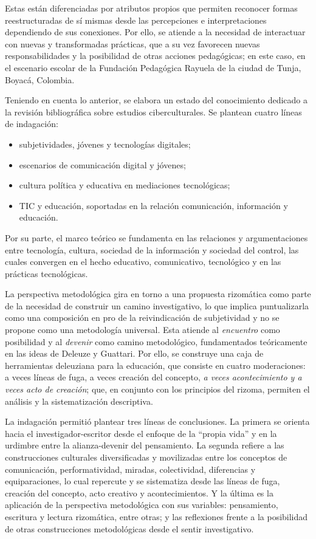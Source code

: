 \documentclass[spanish]{textolivre}
\begin{document}
Estas están diferenciadas por atributos propios que permiten reconocer formas reestructuradas de sí mismas desde las percepciones e interpretaciones dependiendo de sus conexiones. Por ello, se atiende a la necesidad de interactuar con nuevas y transformadas prácticas, que a su vez favorecen nuevas responsabilidades y la posibilidad de otras acciones pedagógicas; en este caso, en el escenario escolar de la Fundación Pedagógica Rayuela de la ciudad de Tunja, Boyacá, Colombia.

Teniendo en cuenta lo anterior, se elabora un estado del conocimiento dedicado a la revisión bibliográfica sobre estudios ciberculturales. Se plantean cuatro líneas de indagación: 

\begin{itemize}
    \item subjetividades, jóvenes y tecnologías digitales;
    \item escenarios de comunicación digital y jóvenes;
    \item cultura política y educativa en mediaciones tecnológicas;
    \item TIC y educación, soportadas en la relación comunicación, información y educación. 
\end{itemize}
    
Por su parte, el marco teórico se fundamenta en las relaciones y argumentaciones entre tecnología, cultura, sociedad de la información y sociedad del control, las cuales convergen en el hecho educativo, comunicativo, tecnológico y en las prácticas tecnológicas. 

La perspectiva metodológica gira en torno a una propuesta rizomática como parte de la necesidad de construir un camino investigativo, lo que implica puntualizarla como una composición en pro de la reivindicación de subjetividad y no se propone como una metodología universal. Esta atiende al \textit{encuentro} como posibilidad y al \textit{devenir} como camino metodológico, fundamentados teóricamente en las ideas de Deleuze y Guattari. Por ello, se construye una caja de herramientas deleuziana para la educación, que consiste en cuatro moderaciones: a veces líneas de fuga, a veces creación del concepto, \textit{a veces acontecimiento y a veces acto de creación}; que, en conjunto con los principios del rizoma, permiten el análisis y la sistematización descriptiva.

La indagación permitió plantear tres líneas de conclusiones. La primera se orienta hacia el investigador-escritor desde el enfoque de la “propia vida” y en la urdimbre entre la alianza-devenir del pensamiento. La segunda refiere a las construcciones culturales diversificadas y movilizadas entre los conceptos de comunicación, performatividad, miradas, colectividad, diferencias y equiparaciones, lo cual repercute y se sistematiza desde las líneas de fuga, creación del concepto, acto creativo y acontecimientos. Y la última es la aplicación de la perspectiva metodológica con sus variables: pensamiento, escritura y lectura rizomática, entre otras; y las reflexiones frente a la posibilidad de otras construcciones metodológicas desde el sentir investigativo.
\end{document}
